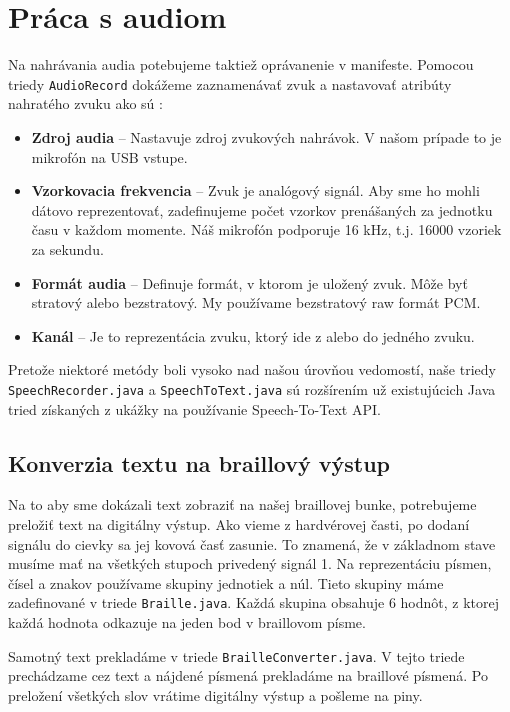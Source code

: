 \documentclass{template/socthesis}
\begin{document}
\section*{Práca s audiom}
Na nahrávania audia potebujeme taktiež oprávanenie v manifeste.  Pomocou triedy \texttt{AudioRecord} dokážeme zaznamenávať zvuk a nastavovať atribúty nahratého zvuku ako sú \cite{audio}: \\
\begin{itemize}
	\item \textbf{Zdroj audia} -- Nastavuje zdroj zvukových nahrávok. V našom prípade to je mikrofón na USB vstupe.
	\item \textbf{Vzorkovacia frekvencia} -- Zvuk je analógový signál. Aby sme ho mohli dátovo reprezentovať, zadefinujeme počet vzorkov prenášaných za jednotku času v každom momente. Náš mikrofón podporuje 16 kHz, t.j. 16000 vzoriek za sekundu.
	\item \textbf{Formát audia} -- Definuje formát, v ktorom je uložený zvuk. Môže byť stratový  alebo bezstratový. My používame bezstratový raw formát PCM.
	\item \textbf{Kanál} -- Je to reprezentácia zvuku, ktorý ide z alebo do jedného zvuku. 
\end{itemize}

Pretože niektoré metódy boli vysoko nad našou úrovňou vedomostí, naše triedy \texttt{SpeechRecorder.java} a \texttt{SpeechToText.java} sú rozšírením už existujúcich Java tried získaných z ukážky\cite{code-audio} na používanie Speech-To-Text API.

\subsection*{Konverzia textu na braillový výstup}
Na to aby sme dokázali text zobraziť na našej braillovej bunke, potrebujeme preložiť text na digitálny výstup. Ako vieme z hardvérovej časti, po dodaní signálu do cievky sa jej kovová časť zasunie. To znamená, že v základnom stave musíme mať na všetkých stupoch privedený signál 1. Na reprezentáciu písmen, čísel a znakov používame skupiny jednotiek a núl. Tieto skupiny máme zadefinované v triede \texttt{Braille.java}. Každá skupina obsahuje 6 hodnôt, z ktorej každá hodnota odkazuje na jeden bod v braillovom písme. 

Samotný text prekladáme v triede \texttt{BrailleConverter.java}. V tejto triede prechádzame cez text a nájdené písmená prekladáme na braillové písmená. Po preložení všetkých slov vrátime digitálny výstup a pošleme na piny.	
\end{document}
